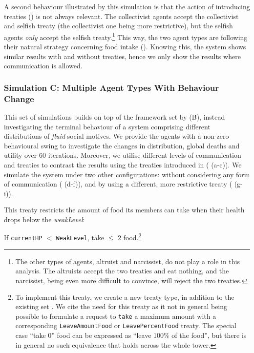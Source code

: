 A second behaviour illustrated by this simulation is that the action of introducing treaties () is not always relevant. The collectivist agents accept the collectivist and selfish treaty (the collectivist one being more restrictive), but the selfish agents \textit{only} accept the selfish treaty.\footnote{The other types of agents, altruist and narcissist, do not play a role in this analysis. The altruists accept the two treaties and eat nothing, and the narcissist, being even more difficult to convince, will reject the two treaties.} This way, the two agent types are following their natural strategy concerning food intake (). Knowing this, the system shows similar results with and without treaties, hence we only show the results where communication is allowed.

\subsubsection{Simulation C: Multiple Agent Types With Behaviour Change}\label{simulation_C}

This set of simulations builds on top of the framework set by (B), instead investigating the terminal behaviour of a system comprising different distributions of \textit{fluid} social motives. We provide the agents with a non-zero behavioural swing to investigate the changes in distribution, global deaths and utility over 60 iterations. Moreover, we utilise different levels of communication and treaties to contrast the results using the treaties introduced in  ( (a-c)). We simulate the system under two other configurations: without considering any form of communication ( (d-f)), and by using a different, more restrictive treaty ( (g-i)).

This treaty restricts the amount of food its members can take when their health drops below the \textit{weakLevel}:

If \texttt{currentHP} $<$ \texttt{WeakLevel}, take $\leq$ 2 food.\footnote{To implement this treaty, we create a new treaty type, in addition to the existing set . We cite the need for this treaty as it not in general being possible to formulate a request to \texttt{take} a maximum amount with a corresponding \texttt{LeaveAmountFood} or \texttt{LeavePercentFood} treaty. The special case ``take 0'' food can be expressed as ``leave 100\% of the food'', but there is in general no such equivalence that holds across the whole tower.}


